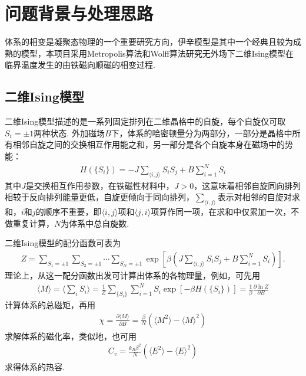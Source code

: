 \documentclass[UTF8,10pt,a4paper]{article}
\theoremstyle{Problem}
\theoremstyle{Solution}
\begin{document}
\thispagestyle{FirstPageStyle}
\tableofcontents
\clearpage

\section{问题背景与处理思路}

体系的相变是凝聚态物理的一个重要研究方向，伊辛模型是其中一个经典且较为成熟的模型，本项目采用Metropolis算法和Wolff算法研究无外场下二维Ising模型在临界温度发生的由铁磁向顺磁的相变过程.

\subsection{二维Ising模型}

二维Ising模型描述的是一系列固定排列在二维晶格中的自旋，每个自旋仅可取$S_i=\pm 1$两种状态. 外加磁场$B$下，体系的哈密顿量分为两部分，一部分是晶格中所有相邻自旋之间的交换相互作用能之和，另一部分是各个自旋本身在磁场中的势能：
\begin{align}
    H(\{S_i\})=-J\sum_{\langle i,j\rangle}S_iS_j+B\sum_{i=1}^NS_i
\end{align}
其中$J$是交换相互作用参数，在铁磁性材料中，$J>0$，这意味着相邻自旋同向排列相较于反向排列能量更低，自旋更倾向于同向排列，$\sum_{\langle i,j\rangle}$表示对相邻的自旋对求和，$i$和$j$的顺序不重要，即$\langle i,j\rangle$项和$\langle j,i\rangle$项算作同一项，在求和中仅累加一次，不做重复计算，$N$为体系中总自旋数.

二维Ising模型的配分函数可表为
\begin{align}
    Z=\sum_{S_1=\pm 1}\sum_{S_2=\pm 1}\cdots\sum_{S_N=\pm 1}\exp[\beta(J\sum_{\langle i,j\rangle}S_iS_j+B\sum_{i=1}^NS_i)].
\end{align}
理论上，从这一配分函数出发可计算出体系的各物理量，例如，可先用
\begin{align}
    \langle M\rangle=\langle\sum_iS_i\rangle=\frac{1}{Z}\sum_{\{S_i\}}\sum_{i=1}^NS_i\exp[-\beta H(\{S_i\})]=\frac{1}{\beta}\frac{\partial\ln Z}{\partial B}
\end{align}
计算体系的总磁矩，再用
\begin{align}
    \chi=\frac{\partial\langle M\rangle}{\partial B}=\frac{\beta}{N}(\langle M^2\rangle-\langle M\rangle^2)
\end{align}
求解体系的磁化率，类似地，也可用
\begin{align}
    C_v=\frac{k_B\beta^2}{N}(\langle E^2\rangle-\langle E\rangle^2)
\end{align}
求得体系的热容.
\end{document}
